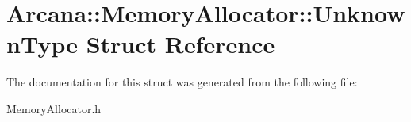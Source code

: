 \hypertarget{struct_arcana_1_1_memory_allocator_1_1_unknown_type}{}\section{Arcana\+:\+:Memory\+Allocator\+:\+:Unknown\+Type Struct Reference}
\label{struct_arcana_1_1_memory_allocator_1_1_unknown_type}


The documentation for this struct was generated from the following file\+:\begin{DoxyCompactItemize}
\item 
Memory\+Allocator.\+h\end{DoxyCompactItemize}
